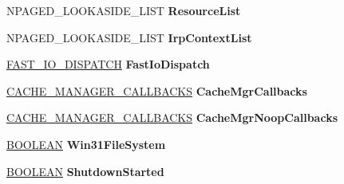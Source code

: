 \begin{DoxyCompactItemize}
\item 
\mbox{\label{struct___f_a_t___g_l_o_b_a_l___d_a_t_a_a3139ff0e2aa44f7eeeca9c66d2848896}} 
N\+P\+A\+G\+E\+D\+\_\+\+L\+O\+O\+K\+A\+S\+I\+D\+E\+\_\+\+L\+I\+ST {\bfseries Resource\+List}
\item 
\mbox{\label{struct___f_a_t___g_l_o_b_a_l___d_a_t_a_a9e2d8438e32098cb131b52a0fb2e3b99}} 
N\+P\+A\+G\+E\+D\+\_\+\+L\+O\+O\+K\+A\+S\+I\+D\+E\+\_\+\+L\+I\+ST {\bfseries Irp\+Context\+List}
\item 
\mbox{\label{struct___f_a_t___g_l_o_b_a_l___d_a_t_a_a9e67d9736bf22b640213eab0dc7503b3}} 
\hyperlink{struct___f_a_s_t___i_o___d_i_s_p_a_t_c_h}{F\+A\+S\+T\+\_\+\+I\+O\+\_\+\+D\+I\+S\+P\+A\+T\+CH} {\bfseries Fast\+Io\+Dispatch}
\item 
\mbox{\label{struct___f_a_t___g_l_o_b_a_l___d_a_t_a_acb8f11c46fff85a68d01d06839343528}} 
\hyperlink{struct___c_a_c_h_e___m_a_n_a_g_e_r___c_a_l_l_b_a_c_k_s}{C\+A\+C\+H\+E\+\_\+\+M\+A\+N\+A\+G\+E\+R\+\_\+\+C\+A\+L\+L\+B\+A\+C\+KS} {\bfseries Cache\+Mgr\+Callbacks}
\item 
\mbox{\label{struct___f_a_t___g_l_o_b_a_l___d_a_t_a_a7caec51a03db4a128fb92200612ba350}} 
\hyperlink{struct___c_a_c_h_e___m_a_n_a_g_e_r___c_a_l_l_b_a_c_k_s}{C\+A\+C\+H\+E\+\_\+\+M\+A\+N\+A\+G\+E\+R\+\_\+\+C\+A\+L\+L\+B\+A\+C\+KS} {\bfseries Cache\+Mgr\+Noop\+Callbacks}
\item 
\mbox{\label{struct___f_a_t___g_l_o_b_a_l___d_a_t_a_ad108807a2093a95aef6db9793e9e3f90}} 
\hyperlink{_processor_bind_8h_a112e3146cb38b6ee95e64d85842e380a}{B\+O\+O\+L\+E\+AN} {\bfseries Win31\+File\+System}
\item 
\mbox{\label{struct___f_a_t___g_l_o_b_a_l___d_a_t_a_a0ac8674e5e4e0f36fa112818c1e0faea}} 
\hyperlink{_processor_bind_8h_a112e3146cb38b6ee95e64d85842e380a}{B\+O\+O\+L\+E\+AN} {\bfseries Shutdown\+Started}
\item 
\mbox{\label{struct___f_a_t___g_l_o_b_a_l___d_a_t_a_a48de7d009e66823efd48dcb5b4a5fca8}} 

\end{DoxyCompactItemize}
